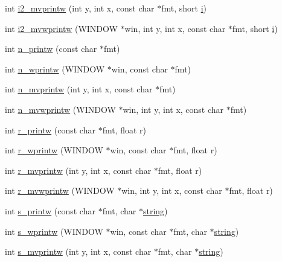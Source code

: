 \begin{DoxyCompactItemize}
\item 
int \hyperlink{C-macros_8c_a32e22b11dad68fa76c882dc89f0997f1}{i2\+\_\+mvprintw} (int y, int x, const char $\ast$fmt, short \hyperlink{intro__blas1_83_8txt_a8ba82a50c0c2c12d5f6a77f7e4651c0b}{i})
\item 
int \hyperlink{C-macros_8c_a880d70f3a8db453d86b23072715762cc}{i2\+\_\+mvwprintw} (W\+I\+N\+D\+OW $\ast$win, int y, int x, const char $\ast$fmt, short \hyperlink{intro__blas1_83_8txt_a8ba82a50c0c2c12d5f6a77f7e4651c0b}{i})
\item 
int \hyperlink{C-macros_8c_a11be0961dcb0e1af9a31aacb25f54116}{n\+\_\+printw} (const char $\ast$fmt)
\item 
int \hyperlink{C-macros_8c_aba52f28e4d247225cd79e21121b88655}{n\+\_\+wprintw} (W\+I\+N\+D\+OW $\ast$win, const char $\ast$fmt)
\item 
int \hyperlink{C-macros_8c_a46f0d46efcc85de74c517a5a30d5bf8c}{n\+\_\+mvprintw} (int y, int x, const char $\ast$fmt)
\item 
int \hyperlink{C-macros_8c_a84bbf8649db5247fc4d8f2d7fe3d22a0}{n\+\_\+mvwprintw} (W\+I\+N\+D\+OW $\ast$win, int y, int x, const char $\ast$fmt)
\item 
int \hyperlink{C-macros_8c_af5706198a4ac8d519c30824899cd04eb}{r\+\_\+printw} (const char $\ast$fmt, float r)
\item 
int \hyperlink{C-macros_8c_a6eb29a28c7477bd1f35254a66f43a4c7}{r\+\_\+wprintw} (W\+I\+N\+D\+OW $\ast$win, const char $\ast$fmt, float r)
\item 
int \hyperlink{C-macros_8c_ad0708b8c6acaba96f40a85f691012abf}{r\+\_\+mvprintw} (int y, int x, const char $\ast$fmt, float r)
\item 
int \hyperlink{C-macros_8c_aee7cd6844203dd1d2b386c1a42fb97bb}{r\+\_\+mvwprintw} (W\+I\+N\+D\+OW $\ast$win, int y, int x, const char $\ast$fmt, float r)
\item 
int \hyperlink{C-macros_8c_a952575ee46d2e04849c57062c2cb769e}{s\+\_\+printw} (const char $\ast$fmt, char $\ast$\hyperlink{what__overview_81_8txt_a74cb7e955273b9f9157b4f0c18a38849}{string})
\item 
int \hyperlink{C-macros_8c_a90e6df6fa68a7a58b21a763fc85a21ff}{s\+\_\+wprintw} (W\+I\+N\+D\+OW $\ast$win, const char $\ast$fmt, char $\ast$\hyperlink{what__overview_81_8txt_a74cb7e955273b9f9157b4f0c18a38849}{string})
\item 
int \hyperlink{C-macros_8c_a9b49cfc267a4953f8983e6e50aa43aaa}{s\+\_\+mvprintw} (int y, int x, const char $\ast$fmt, char $\ast$\hyperlink{what__overview_81_8txt_a74cb7e955273b9f9157b4f0c18a38849}{string})

\end{DoxyCompactItemize}
